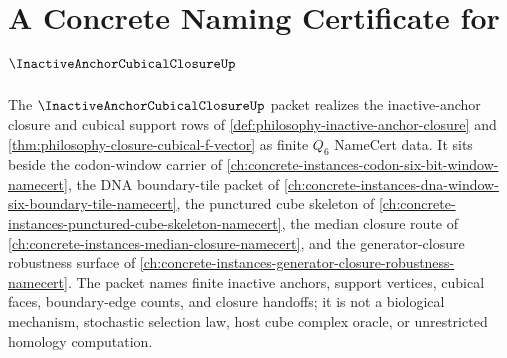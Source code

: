 \chapter{A Concrete Naming Certificate for $\InactiveAnchorCubicalClosureUp$}
\label{ch:concrete-instances-inactive-anchor-cubical-closure-namecert}

The $\InactiveAnchorCubicalClosureUp$ packet realizes the inactive-anchor closure and cubical support rows of \autoref{def:philosophy-inactive-anchor-closure} and \autoref{thm:philosophy-closure-cubical-f-vector} as finite $Q_{6}$ NameCert data. It sits beside the codon-window carrier of \autoref{ch:concrete-instances-codon-six-bit-window-namecert}, the DNA boundary-tile packet of \autoref{ch:concrete-instances-dna-window-six-boundary-tile-namecert}, the punctured cube skeleton of \autoref{ch:concrete-instances-punctured-cube-skeleton-namecert}, the median closure route of \autoref{ch:concrete-instances-median-closure-namecert}, and the generator-closure robustness surface of \autoref{ch:concrete-instances-generator-closure-robustness-namecert}. The packet names finite inactive anchors, support vertices, cubical faces, boundary-edge counts, and closure handoffs; it is not a biological mechanism, stochastic selection law, host cube complex oracle, or unrestricted homology computation.

